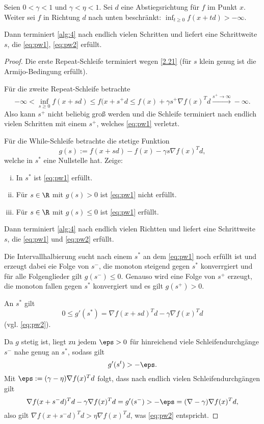 \begin{st} \label{2.38}
	Seien $0<\gamma<1$ und $\gamma<\eta<1$.
	Sei $d$ eine Abstiegsrichtung für $f$ im Punkt $x$.
	Weiter sei $f$ in Richtung $d$ nach unten beschränkt: $\inf_{t\ge 0}f(x+td) > -\infty$.

	Dann terminiert \ref{alg:4} nach endlich vielen Schritten und liefert eine Schrittweite $s$, die \ref{eq:pw1}, \ref{eq:pw2} erfüllt.
	\begin{proof}
		Die erste Repeat-Schleife terminiert wegen \ref{2.21} (für $s$ klein genug ist die Armijo-Bedingung erfüllt).

		Für die zweite Repeat-Schleife betrachte
		\[
			-\infty
			< \inf_{s\ge 0} f(x+sd)
			\le f(x+s^+ d
			\le f(x) + \gamma s^+ \nabla f(x)^T d
			\xrightarrow{s^+\to\infty} -\infty.
		\]
		Also kann $s^+$ nicht beliebig groß werden und die Schleife terminiert nach endlich vielen Schritten mit einem $s^+$, welches \ref{eq:pw1} verletzt.

		Für die While-Schleife betrachte die stetige Funktion
		\[
			g(s) := f(x+sd) - f(x) - \gamma s \nabla f(x)^T d,
		\]
		welche in $s^*$ eine Nullstelle hat.
		Zeige:
		\begin{enumerate}[(i)]
			\item
				In $s^*$ ist \ref{eq:pw1} erfüllt.
			\item
				Für $s \in \R$ mit $g(s) > 0$ ist \ref{eq:pw1} nicht erfüllt.
			\item
				Für $s \in \R$ mit $g(s) \le 0$ ist \ref{eq:pw1} erfüllt.
		\end{enumerate}
		Dann terminiert \ref{alg:4} nach endlich vielen Richtten und liefert eine Schrittweite $s$, die \ref{eq:pw1} und \ref{eq:pw2} erfüllt.

		Die Intervallhalbierung sucht nach einem $s^*$ an dem \ref{eq:pw1} noch erfüllt ist und erzeugt dabei eie Folge von $s^-$, die monoton steigend gegen $s^*$ konverrgiert und für alle Folgenglieder gilt $g(s^-) \le 0$.
		Genauso wird eine Folge von $s^+$ erzeugt, die monoton fallen gegen $s^*$ konvergiert und es gilt $g(s^+) > 0$.

		An $s^*$ gilt
		\[
			0
			\le g'(s^*)
			= \nabla f(x+sd)^T d - \gamma \nabla f(x)^T d
		\]
		(vgl. \ref{eq:pw2}).

		Da $g$ stetig ist, liegt zu jedem $\eps > 0$ für hinreichend viele Schleifendurchgänge $s^-$ nahe genug an $s^*$, sodass gilt
		\[
			g'(s^t) > - \eps.
		\]
		Mit $\eps := (\gamma - \eta) \nabla f(x)^T d$ folgt, dass nach endlich vielen Schleifendurchgängen gilt
		\[
			\nabla f(x+s^- d)^T d - \gamma \nabla f(x)^T d
			= g'(s^-)
			> - \eps
			= (\nabla - \gamma) \nabla f(x)^T d,
		\]
		also gilt $\nabla f(x+s^- d)^T d > \eta \nabla f(x)^T d$, was \ref{eq:pw2} entspricht.
	\end{proof}
\end{st}

